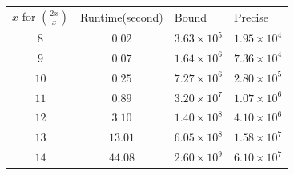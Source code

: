 \documentclass[11pt,a4paper,oneside]{article}
\begin{document}
\begin{problem}{3}
\begin{table}[htbp]
		\begin{tabular}{cccc}
		\multicolumn{1}{l}{$x$ for ${2x \choose x}$} & \multicolumn{1}{l}{Runtime(second)} & \multicolumn{1}{l}{Bound} & \multicolumn{1}{l}{Precise} \\
		$               8$&$0.02$&$3.63 \times 10^{ 5 }$&$1.95 \times 10^{ 4 }$\\
		$               9$&$0.07$&$1.64 \times 10^{ 6 }$&$7.36 \times 10^{ 4 }$\\
		$               10$&$0.25$&$7.27 \times 10^{ 6 }$&$2.80 \times 10^{ 5 }$\\
		$               11$&$0.89$&$3.20 \times 10^{ 7 }$&$1.07 \times 10^{ 6 }$\\
		$               12$&$3.10$&$1.40 \times 10^{ 8 }$&$4.10 \times 10^{ 6 }$\\
		$               13$&$13.01$&$6.05 \times 10^{ 8 }$&$1.58 \times 10^{ 7 }$\\
		$               14$&$44.08$&$2.60 \times 10^{ 9 }$&$6.10 \times 10^{ 7 }$\\


\end{tabular}
\end{table}
\end{problem}
\end{document}
